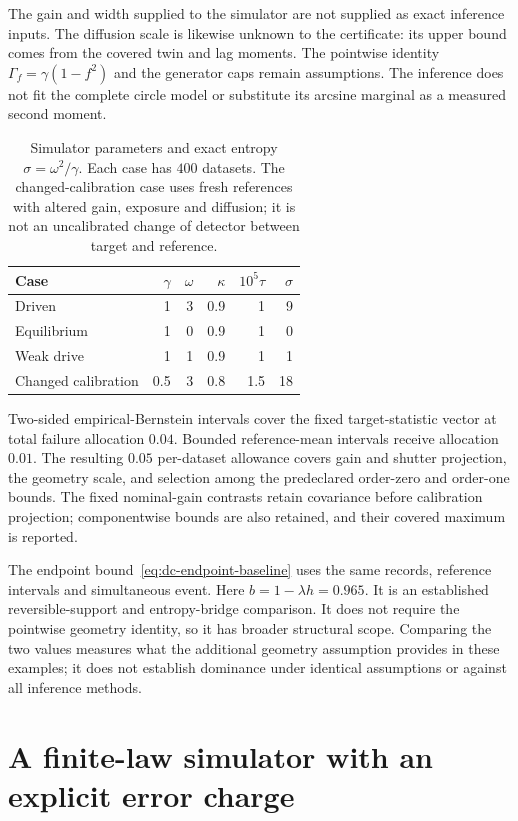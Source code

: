 The gain and width supplied to the simulator are not supplied as exact
inference inputs.  The diffusion scale is likewise unknown to the
certificate: its upper bound comes from the covered twin and lag moments.
The pointwise identity $\Gamma_f=\gamma(1-f^2)$ and the generator caps remain
assumptions.  The inference does not fit the complete circle model or
substitute its arcsine marginal as a measured second moment.

\begin{table}[htbp]
\centering
\begin{tabular}{lrrrrr}
\hline
Case & $\gamma$ & $\omega$ & $\kappa$ & $10^5\tau$ & $\sigma$\\
\hline
Driven & 1 & 3 & 0.9 & 1 & 9\\
Equilibrium & 1 & 0 & 0.9 & 1 & 0\\
Weak drive & 1 & 1 & 0.9 & 1 & 1\\
Changed calibration & 0.5 & 3 & 0.8 & 1.5 & 18\\
\hline
\end{tabular}
\caption{Simulator parameters and exact entropy $\sigma=\omega^2/\gamma$.
Each case has $400$ datasets.  The changed-calibration case uses fresh
references with altered gain, exposure and diffusion; it is not an
uncalibrated change of detector between target and reference.}
\label{tab:dc-benchmark-cases}
\end{table}

Two-sided empirical-Bernstein intervals cover the fixed target-statistic
vector at total failure allocation $0.04$.  Bounded reference-mean intervals
receive allocation $0.01$.  The resulting $0.05$ per-dataset allowance covers
gain and shutter projection, the geometry scale, and selection among the
predeclared order-zero and order-one bounds.  The fixed nominal-gain
contrasts retain covariance before calibration projection; componentwise
bounds are also retained, and their covered maximum is reported.

The endpoint bound~\eqref{eq:dc-endpoint-baseline} uses the same records,
reference intervals and simultaneous event.  Here $b=1-\lambda h=0.965$.
It is an established reversible-support and entropy-bridge comparison.  It
does not require the pointwise geometry identity, so it has broader
structural scope.  Comparing the two values measures what the additional
geometry assumption provides in these examples; it does not establish
dominance under identical assumptions or against all inference methods.

\section{A finite-law simulator with an explicit error charge}

